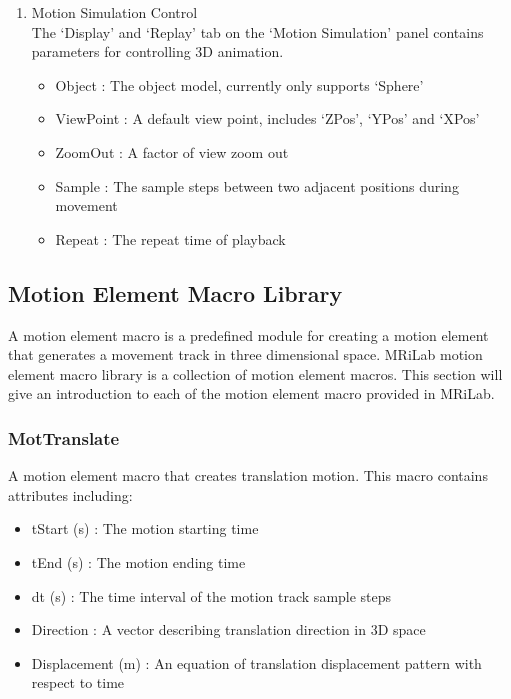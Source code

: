 \documentclass{book}%
\begin{document}
\begin{enumerate}
	\item Motion Simulation Control \\
	
The `Display' and `Replay' tab on the `Motion Simulation' panel contains parameters for controlling 3D animation.

\begin{itemize}
	\item Object : The object model, currently only supports `Sphere'
	\item ViewPoint : A default view point, includes `ZPos', `YPos' and `XPos'
	\item ZoomOut : A factor of view zoom out
	\item Sample : The sample steps between two adjacent positions during movement
	\item Repeat : The repeat time of playback
\end{itemize}
	
\end{enumerate}


\subsection{Motion Element Macro Library}

A motion element macro is a predefined module for creating a motion element that generates a movement track in three dimensional space. MRiLab motion element macro library is a collection of motion element macros. This section will give an introduction to each of the motion element macro provided in MRiLab.

\subsubsection{MotTranslate}

A motion element macro that creates translation motion. This macro contains attributes including:

\begin{itemize}
	\item tStart (s) : The motion starting time
  \item tEnd (s) : The motion ending time
	\item dt (s) : The time interval of the motion track sample steps
	\item Direction : A vector describing translation direction in 3D space
	\item Displacement (m) : An equation of translation displacement pattern with respect to time
\end{itemize}
\end{document}
